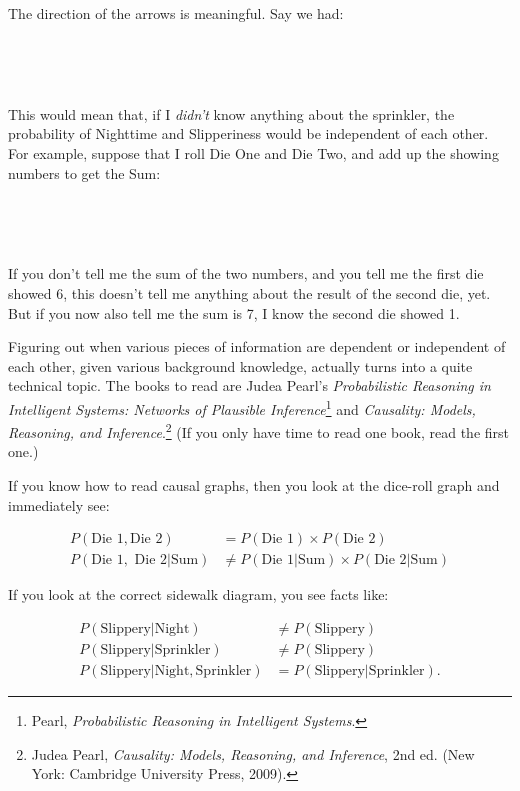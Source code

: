 {
 The direction of the arrows is meaningful. Say we had:}

{
 ~}


{
 ~}

{
 This would mean that, if I \textit{didn't} know
anything about the sprinkler, the probability of Nighttime and
Slipperiness would be independent of each other. For example, suppose
that I roll Die One and Die Two, and add up the showing numbers to get
the Sum:}

{
 ~}



{
 ~}

{
 If you don't tell me the sum of the two numbers,
and you tell me the first die showed 6, this doesn't
tell me anything about the result of the second die, yet. But if you
now also tell me the sum is 7, I know the second die showed 1.}

{
 Figuring out when various pieces of information are dependent or
independent of each other, given various background knowledge, actually
turns into a quite technical topic. The books to read are Judea
Pearl's \textit{Probabilistic Reasoning in Intelligent
Systems: Networks of Plausible Inference}\footnote{Pearl, \textit{Probabilistic Reasoning in Intelligent
Systems}.} and
\textit{Causality: Models, Reasoning, and
Inference}.\footnote{Judea Pearl, \textit{Causality: Models, Reasoning, and
Inference}, 2nd ed. (New York: Cambridge University Press, 2009).} (If you only have time to read one book,
read the first one.)}

{
 If you know how to read causal graphs, then you look at the
dice-roll graph and immediately see:}

\begin{align*}
 P(\text{Die 1},\text{Die 2}) &= P(\text{Die 1}) \times P(\text{Die 2})\\
 P(\text{Die 1},\text{ Die 2}|\text{Sum}) &\neq P(\text{Die 1}|\text{Sum})
 \times P(\text{Die 2}|\text{Sum})
\end{align*}

{
 If you look at the correct sidewalk diagram, you see facts like:}

\begin{align*}
 P(\text{Slippery}|\text{Night}) &\neq P(\text{Slippery}) \\
 P(\text{Slippery}|\text{Sprinkler}) &\neq P(\text{Slippery})\\
 P(\text{Slippery}|\text{Night}, \text{Sprinkler}) &= P(\text{Slippery}|\text{Sprinkler}).
\end{align*}

